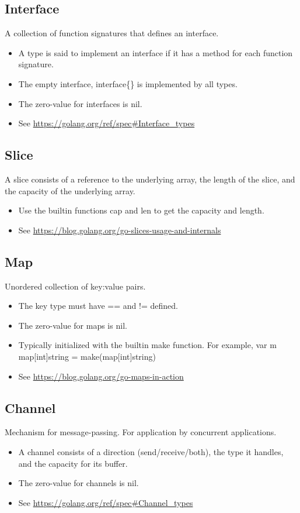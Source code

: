\documentclass{article}
\begin{document}
	\subsection{Interface}
		A collection of function signatures that defines an interface. 
		\begin{itemize}
			\item A type is said to implement an interface if it has a method for each function signature.
			\item The empty interface, \colorbox{code}{interface\{\}} is implemented by all types. 
			\item The zero-value for interfaces is \colorbox{code}{nil}.
			\item See \url{https://golang.org/ref/spec#Interface_types}
		\end{itemize}
		
	\subsection{Slice}
		A slice consists of a reference to the underlying array, the length of the slice, and the capacity of the underlying array. 				
		\begin{itemize}
			\item Use the builtin functions \colorbox{code}{cap} and \colorbox{code}{len} to get the capacity and length.
			\item See \url{https://blog.golang.org/go-slices-usage-and-internals}
		\end{itemize}
				
	\subsection{Map}
		Unordered collection of key:value pairs. 
		\begin{itemize}
			\item The key type must have \colorbox{code}{==} and \colorbox{code}{!=} defined. 
			\item The zero-value for maps is \colorbox{code}{nil}.
			\item Typically initialized with the builtin \colorbox{code}{make} function. For example, \colorbox{code}{var m map[int]string = make(map[int]string)}
			\item See \url{https://blog.golang.org/go-maps-in-action}
		\end{itemize}
		
	\subsection{Channel}
		Mechanism for message-passing. For application by concurrent applications.
		\begin{itemize}
			\item A channel consists of a direction (send/receive/both), the type it handles, and the capacity for its buffer. 
			\item The zero-value for channels is \colorbox{code}{nil}.
			\item See \url{https://golang.org/ref/spec#Channel_types}
		\end{itemize}
	
\end{document}
